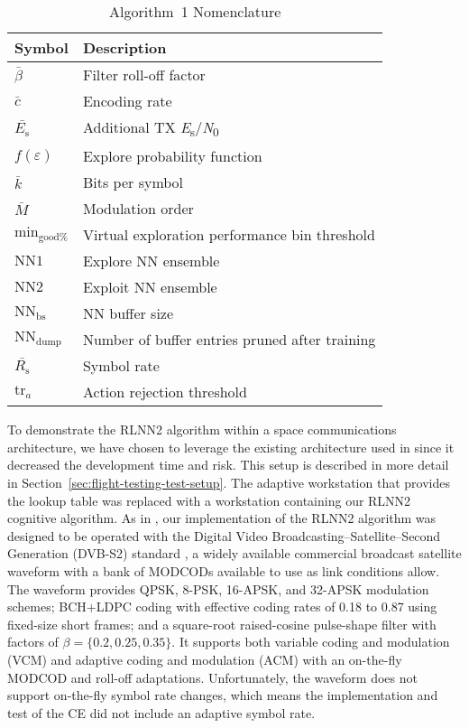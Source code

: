 \documentclass[journal]{IEEEtran}
\let\MYoriglatexcaption\caption
\renewcommand{\caption}[2][\relax]{\MYoriglatexcaption[#2]{#2}}
\begin{document}
 \begin{table}[h]
 \caption{Algorithm~1 Nomenclature}
 \begin{center}
   \begin{tabular}{l|l}
		\hline		
		Symbol & Description	\\	
		\hline
		$\bar{\beta}$ & Filter roll-off factor\\		
		$\bar{c}$ & Encoding rate\\		
		$\bar{E_{\textrm{s}}}$ & Additional TX \textit{E}\textsubscript{s}/\textit{N}\textsubscript{0}\\
		$f(\varepsilon)$ & Explore probability function\\
		$\bar{k}$ & Bits per symbol\\
		$\bar{M}$ & Modulation order\\
		$\textrm{min}_{\mathrm{good}\%}$ & Virtual exploration performance bin threshold\\
		$\textrm{NN1}$ & Explore NN ensemble \\
		$\textrm{NN2}$ & Exploit NN ensemble \\
		$\textrm{NN}_{\textrm{bs}}$ & NN buffer size\\
		$\textrm{NN}_{\textrm{dump}}$ & Number of buffer entries pruned after  training\\
		$\bar{R_{\textrm{s}}}$ & Symbol rate \\
		$\textrm{tr}_{a}$ & Action rejection threshold\\
		\hline
	\end{tabular}
\end{center}
 \end{table}


To demonstrate the RLNN2 algorithm within a space communications architecture, we have chosen to leverage the existing architecture used in \cite{downey-paper} since it decreased the development time and risk.  This setup is described in more detail in Section~\ref{sec:flight-testing-test-setup}.  The adaptive workstation that provides the lookup table was replaced with a workstation containing our RLNN2 cognitive algorithm.  As in \cite{downey-paper}, our implementation of the RLNN2 algorithm was designed to be operated with the Digital Video Broadcasting--Satellite--Second Generation (DVB-S2) standard \cite{dvbs2-standard}, a widely available commercial broadcast satellite waveform with a bank of MODCODs available to use as link conditions allow.  The waveform provides QPSK, 8-PSK, 16-APSK, and 32-APSK modulation schemes; BCH+LDPC coding with effective coding rates of 0.18 to 0.87 using fixed-size short frames; and a square-root raised-cosine pulse-shape filter with factors of $\beta=\{0.2,0.25,0.35\}$.  It supports both variable coding and modulation (VCM) and adaptive coding and modulation (ACM) with an on-the-fly MODCOD and roll-off adaptations.  Unfortunately, the waveform does not support on-the-fly symbol rate changes, which means the implementation and test of the CE did not include an adaptive symbol rate.
\end{document}
